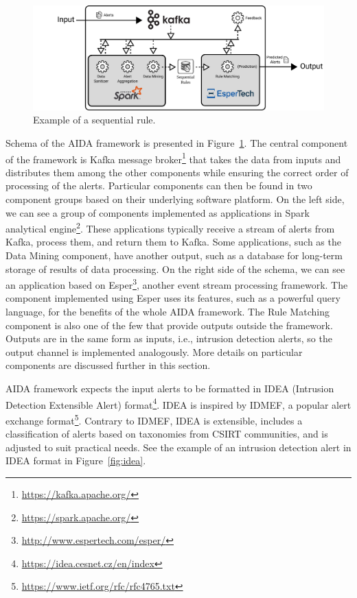 \documentclass[a4paper]{article} %
\begin{document}
\begin{figure}[h]
\includegraphics[width=\textwidth]{fig/aida_schema}
\caption{Example of a sequential rule.}
\label{fig:aida}
\end{figure}

Schema of the AIDA framework is presented in Figure~\ref{fig:aida}. The central component of the framework is Kafka message broker\footnote{\url{https://kafka.apache.org/}} that takes the data from inputs and distributes them among the other components while ensuring the correct order of processing of the alerts. Particular components can then be found in two component groups based on their underlying software platform. On the left side, we can see a group of components implemented as applications in Spark analytical engine\footnote{\url{https://spark.apache.org/}}. These applications typically receive a stream of alerts from Kafka, process them, and return them to Kafka. Some applications, such as the Data Mining component, have another output, such as a database for long-term storage of results of data processing. On the right side of the schema, we can see an application based on Esper\footnote{\url{http://www.espertech.com/esper/}}, another event stream processing framework. The component implemented using Esper uses its features, such as a powerful query language, for the benefits of the whole AIDA framework. The Rule Matching component is also one of the few that provide outputs outside the framework. Outputs are in the same form as inputs, i.e., intrusion detection alerts, so the output channel is implemented analogously. More details on particular components are discussed further in this section.

\bigskip

AIDA framework expects the input alerts to be formatted in IDEA (Intrusion Detection Extensible Alert) format\footnote{\url{https://idea.cesnet.cz/en/index}}. IDEA is inspired by IDMEF, a popular alert exchange format\footnote{\url{https://www.ietf.org/rfc/rfc4765.txt}}. Contrary to IDMEF, IDEA is extensible, includes a classification of alerts based on taxonomies from CSIRT communities, and is adjusted to suit practical needs. See the example of an intrusion detection alert in IDEA format in Figure~\ref{fig:idea}.
\end{document}
